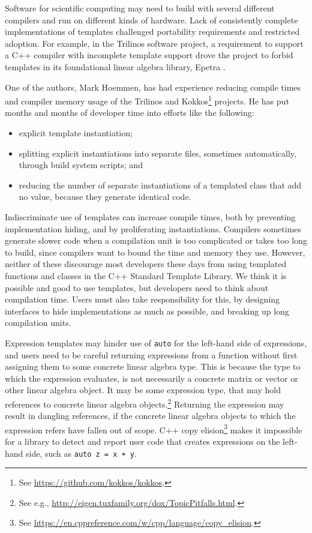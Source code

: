 Software for scientific computing may need to build with several
different compilers and run on different kinds of hardware. Lack of
consistently complete implementations of templates challenged
portability requirements and restricted adoption. For example, in the
Trilinos software project, a requirement to support a C++ compiler
with incomplete template support drove the project to forbid templates
in its foundational linear algebra library, Epetra
\cite{hoemmen2018history}.

One of the authors, Mark Hoemmen, has had experience reducing compile
times and compiler memory usage of the Trilinos
\cite{heroux2005trilinos} and Kokkos\footnote{See
  \url{https://github.com/kokkos/kokkos}.} projects.  He has put
months and months of developer time into efforts like the following:
\begin{itemize}
\item explicit template instantiation;
\item splitting explicit instantiations into separate files, sometimes
  automatically, through build system scripts; and
\item reducing the number of separate instantiations of a templated
  class that add no value, because they generate identical code.
\end{itemize}
Indiscriminate use of templates can increase compile times, both by
preventing implementation hiding, and by proliferating instantiations.
Compilers sometimes generate slower code when a compilation unit is
too complicated or takes too long to build, since compilers want to
bound the time and memory they use.  However, neither of these
discourage most developers these days from using templated functions
and classes in the C++ Standard Template Library.  We think it is
possible and good to use templates, but developers need to think about
compilation time.  Users must also take responsibility for this, by
designing interfaces to hide implementations as much as possible, and
breaking up long compilation units.

Expression templates may hinder use of \texttt{auto} for the left-hand
side of expressions, and users need to be careful returning
expressions from a function without first assigning them to some
concrete linear algebra type.  This is because the type to which the
expression evaluates, is not necessarily a concrete matrix or vector
or other linear algebra object.  It may be some expression type, that
may hold references to concrete linear algebra objects.\footnote{See
  e.g., \url{http://eigen.tuxfamily.org/dox/TopicPitfalls.html}.}
Returning the expression may result in dangling references, if the
concrete linear algebra objects to which the expression refers have
fallen out of scope.  C++ copy elision\footnote{See
  \url{https://en.cppreference.com/w/cpp/language/copy_elision}.}
makes it impossible for a library to detect and report user code that
creates expressions on the left-hand side, such as \texttt{auto z = x
  + y}.

